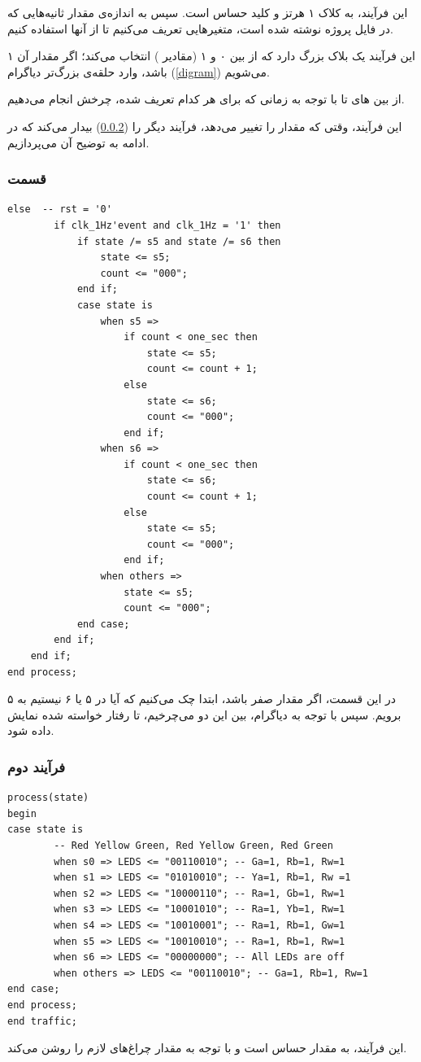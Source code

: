 \documentclass[dvipsnames, svgnames, x11names, a4paper, 11pt]{article}
\begin{document}
این فرآیند، به کلاک ۱ هرتز و کلید  حساس است. سپس به اندازه‌ی مقدار ثانیه‌هایی که در فایل پروژه نوشته شده است، متغیر‌هایی تعریف می‌کنیم تا از آنها استفاده کنیم.

این فرآیند یک بلاک  بزرگ دارد که از بین ۰ و ۱ (مقادیر ) انتخاب می‌کند؛ اگر مقدار آن ۱ باشد، وارد حلقه‌ی بزرگ‌‌تر دیاگرام (\ref{digram}) می‌شویم.

از بین 
های
تا
با توجه به زمانی که برای هر کدام تعریف شده، چرخش انجام می‌دهیم.

این فرآیند، وقتی که مقدار 
را تغییر می‌دهد، فرآیند دیگر را (\ref{second-process}) بیدار می‌کند که در ادامه به توضیح آن می‌پردازیم.

\newpage
\subsubsection{قسمت }
\begin{latin}
\begin{lstlisting}[firstnumber=101]
    else  -- rst = '0'
        if clk_1Hz'event and clk_1Hz = '1' then
			if state /= s5 and state /= s6 then
				state <= s5;
				count <= "000";
			end if;
			case state is
				when s5 =>
					if count < one_sec then
						state <= s5;
						count <= count + 1;
					else
						state <= s6;
						count <= "000";
					end if;
				when s6 =>
					if count < one_sec then
						state <= s6;
						count <= count + 1;
					else
						state <= s5;
						count <= "000";
					end if;
				when others =>
					state <= s5;
					count <= "000";
            end case;
        end if;
    end if;
end process;
\end{lstlisting}
\end{latin}

در این قسمت، اگر مقدار  صفر باشد، ابتدا چک می‌کنیم که آیا در 
۵
 یا ۶ نیستیم به 
۵ برویم. سپس با توجه به دیاگرام، بین این دو 
می‌چرخیم، تا رفتار خواسته شده نمایش داده شود.

\newpage
\subsubsection{فرآیند دوم}
\label{second-process}
\begin{latin}
\begin{lstlisting}[firstnumber=131]
process(state)
begin
case state is
		-- Red Yellow Green, Red Yellow Green, Red Green
		when s0 => LEDS <= "00110010"; -- Ga=1, Rb=1, Rw=1
		when s1 => LEDS <= "01010010"; -- Ya=1, Rb=1, Rw =1
		when s2 => LEDS <= "10000110"; -- Ra=1, Gb=1, Rw=1
		when s3 => LEDS <= "10001010"; -- Ra=1, Yb=1, Rw=1
		when s4 => LEDS <= "10010001"; -- Ra=1, Rb=1, Gw=1
		when s5 => LEDS <= "10010010"; -- Ra=1, Rb=1, Rw=1
		when s6 => LEDS <= "00000000"; -- All LEDs are off
		when others => LEDS <= "00110010"; -- Ga=1, Rb=1, Rw=1
end case;
end process;
end traffic;
\end{lstlisting}
\end{latin}

این فرآیند، به مقدار 
حساس است و با توجه به مقدار 
چراغ‌های لازم را روشن می‌کند.
\end{document}

